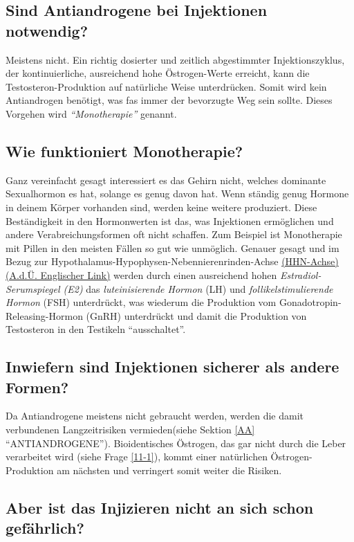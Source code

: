 \documentclass{article}
\begin{document}
\subsection{Sind Antiandrogene bei Injektionen notwendig?}

Meistens nicht. Ein richtig dosierter und zeitlich abgestimmter Injektionszyklus, der kontinuierliche, ausreichend hohe Östrogen-Werte erreicht, kann die Testosteron-Produktion auf natürliche Weise unterdrücken. Somit wird kein Antiandrogen benötigt, was fas immer der bevorzugte Weg sein sollte. Dieses Vorgehen wird \textit{“Monotherapie”} genannt.

\subsection{Wie funktioniert Monotherapie?}\label{2-3}

Ganz vereinfacht gesagt interessiert es das Gehirn nicht, welches dominante Sexualhormon es hat, solange es genug davon hat. Wenn ständig genug Hormone in deinem Körper vorhanden sind, werden keine weitere produziert. Diese Beständigkeit in den Hormonwerten ist das, was Injektionen ermöglichen und andere Verabreichungsformen oft nicht schaffen. Zum Beispiel ist Monotherapie mit Pillen in den meisten Fällen so gut wie unmöglich. Genauer gesagt und im Bezug zur Hypothalamus-Hypophysen-Nebennierenrinden-Achse \href{https://en.wikipedia.org/wiki/Hypothalamic-pituitary-gonadal_axis}{(HHN-Achse) (A.d.Ü. Englischer Link)} werden durch einen ausreichend hohen \textit{Estradiol-Serumspiegel (E2)} das \textit{luteinisierende Hormon} (LH) und \textit{follikelstimulierende Hormon} (FSH) unterdrückt, was wiederum die Produktion vom Gonadotropin-Releasing-Hormon (GnRH) unterdrückt und damit die Produktion von Testosteron in den Testikeln “ausschaltet”.

\subsection{Inwiefern sind Injektionen sicherer als andere Formen?}

Da Antiandrogene meistens nicht gebraucht werden, werden die damit verbundenen Langzeitrisiken vermieden(siehe Sektion \ref{AA} “ANTIANDROGENE”). Bioidentisches Östrogen, das gar nicht durch die Leber verarbeitet wird (siehe Frage \ref{11-1}), kommt einer natürlichen Östrogen-Produktion am nächsten und verringert somit weiter die Risiken.

\subsection{Aber ist das Injizieren nicht an sich schon gefährlich?}
\end{document}

